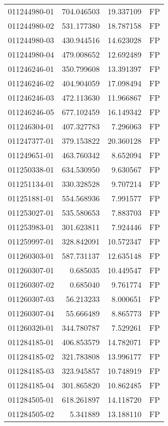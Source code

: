 \begin{tabular}{lrrl}
011244980-01 &  704.046503 &    19.337109 &   FP \\
011244980-02 &  531.177380 &    18.787158 &   FP \\
011244980-03 &  430.944516 &    14.623028 &   FP \\
011244980-04 &  479.008652 &    12.692489 &   FP \\
011246246-01 &  350.799608 &    13.391397 &   FP \\
011246246-02 &  404.904059 &    17.098494 &   FP \\
011246246-03 &  472.113630 &    11.966867 &   FP \\
011246246-05 &  677.102459 &    16.149342 &   FP \\
011246304-01 &  407.327783 &     7.296063 &   FP \\
011247377-01 &  379.153822 &    20.360128 &   FP \\
011249651-01 &  463.760342 &     8.652094 &   FP \\
011250338-01 &  634.530950 &     9.630567 &   FP \\
011251134-01 &  330.328528 &     9.707214 &   FP \\
011251881-01 &  554.568936 &     7.991577 &   FP \\
011253027-01 &  535.580653 &     7.883703 &   FP \\
011253983-01 &  301.623811 &     7.924446 &   FP \\
011259997-01 &  328.842091 &    10.572347 &   FP \\
011260303-01 &  587.731137 &    12.635148 &   FP \\
011260307-01 &    0.685035 &    10.449547 &   FP \\
011260307-02 &    0.685040 &     9.761774 &   FP \\
011260307-03 &   56.213233 &     8.000651 &   FP \\
011260307-04 &   55.666489 &     8.865773 &   FP \\
011260320-01 &  344.780787 &     7.529261 &   FP \\
011284185-01 &  406.853579 &    14.782071 &   FP \\
011284185-02 &  321.783808 &    13.996177 &   FP \\
011284185-03 &  323.945857 &    10.748919 &   FP \\
011284185-04 &  301.865820 &    10.862485 &   FP \\
011284505-01 &  618.261897 &    14.118720 &   FP \\
011284505-02 &    5.341889 &    13.188110 &   FP \\

\end{tabular}
